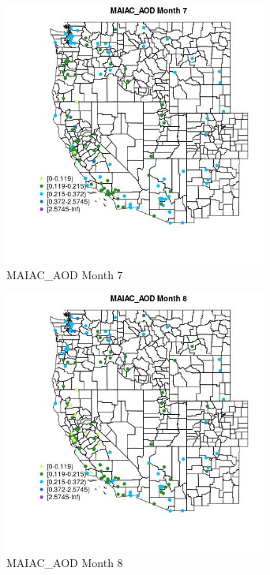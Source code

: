 \begin{figure} 
\centering  
\includegraphics[width=0.77\textwidth]{Code_Outputs/Report_ML_input_PM25_Step4_part_e_de_duplicated_aves_MapObsMo7MAIAC_AOD.jpg} 
\caption{\label{fig:Report_ML_input_PM25_Step4_part_e_de_duplicated_avesMapObsMo7MAIAC_AOD}MAIAC_AOD Month 7} 
\end{figure} 
 

\begin{figure} 
\centering  
\includegraphics[width=0.77\textwidth]{Code_Outputs/Report_ML_input_PM25_Step4_part_e_de_duplicated_aves_MapObsMo8MAIAC_AOD.jpg} 
\caption{\label{fig:Report_ML_input_PM25_Step4_part_e_de_duplicated_avesMapObsMo8MAIAC_AOD}MAIAC_AOD Month 8} 
\end{figure} 
 

